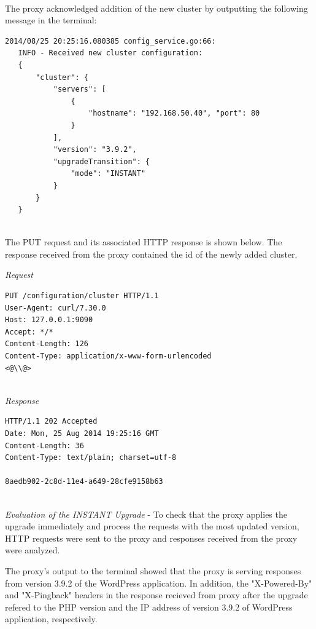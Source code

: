 \documentclass[a4paper,11pt,twoside]{report}
\begin{document}
\noindent\\
The proxy acknowledged addition of the new cluster by outputting the following message in the terminal: \smallskip 

\begin{lstlisting}[language=terminal] 
2014/08/25 20:25:16.080385 config_service.go:66:     
   INFO - Received new cluster configuration:
   {
       "cluster": {
           "servers": [
               {
                   "hostname": "192.168.50.40", "port": 80
               }
           ],
           "version": "3.9.2",
           "upgradeTransition": {
               "mode": "INSTANT"
           }
       }
   } 
\end{lstlisting}   

\noindent\\
The PUT request and its associated HTTP response is shown below. The response received from the proxy contained the id of the newly added cluster.\smallskip 

\noindent
\textit{Request}
\begin{lstlisting}[language=terminal]
PUT /configuration/cluster HTTP/1.1
User-Agent: curl/7.30.0
Host: 127.0.0.1:9090
Accept: */*
Content-Length: 126
Content-Type: application/x-www-form-urlencoded
<@\\@>
\end{lstlisting}

\noindent\\
\textit{Response}
\begin{lstlisting}[language=terminal]
HTTP/1.1 202 Accepted
Date: Mon, 25 Aug 2014 19:25:16 GMT
Content-Length: 36
Content-Type: text/plain; charset=utf-8

8aedb902-2c8d-11e4-a649-28cfe9158b63
\end{lstlisting}  

\noindent\\
\textit{Evaluation of the INSTANT Upgrade} - To check that the proxy applies the upgrade immediately and process the requests with the most updated version, HTTP requests were sent to the proxy and responses received from the proxy were analyzed.

The proxy's output to the terminal showed that the proxy is serving responses from version 3.9.2 of the WordPress application. In addition, the "X-Powered-By" and "X-Pingback" headers in the response recieved from proxy after the upgrade refered to the PHP version and the IP address of version 3.9.2 of WordPress application, respectively. \smallskip 
\end{document}
